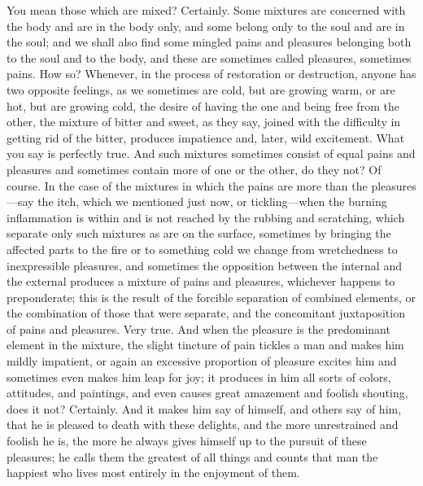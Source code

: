 \documentclass[letterpaper,12pt]{article}
\newcommand{\stephpag}[1]{\marginnote{\small\itshape\fontfamily{ppl}\selectfont #1}}
\begin{document}
\begin{drama}
\socratesspeaks
You mean those which are mixed?
\protarchusspeaks
Certainly.
\socratesspeaks
Some mixtures are concerned with the body and are in the body only, and some belong only to the soul and are in the soul; \stephpag{c} and we shall also find some mingled pains and pleasures belonging both to the soul and to the body, and these are sometimes called pleasures, sometimes pains.
\protarchusspeaks
How so?
\socratesspeaks
Whenever, in the process of restoration or destruction, anyone has two opposite feelings, as we sometimes are cold, but are growing warm, or are hot, but are growing cold, the desire of having the one and being free from the other, the mixture of bitter and sweet, as they say, joined with the difficulty in getting rid of the bitter, \stephpag{d} produces impatience and, later, wild excitement.
\protarchusspeaks
What you say is perfectly true.
\socratesspeaks
And such mixtures sometimes consist of equal pains and pleasures and sometimes contain more of one or the other, do they not?
\protarchusspeaks
Of course.
\socratesspeaks
In the case of the mixtures in which the pains are more than the pleasures---say the itch, which we mentioned just now, or tickling---when the burning inflammation is within and is not reached by the rubbing and scratching, \stephpag{e} which separate only such mixtures as are on the surface, sometimes by bringing the affected parts to the fire or to something cold we change from wretchedness to inexpressible pleasures, and sometimes the opposition between the internal and the external produces a mixture of pains and pleasures, whichever happens to preponderate; this is the result of the forcible separation of combined elements, \stephpag{47 a} or the combination of those that were separate, and the concomitant juxtaposition of pains and pleasures.
\protarchusspeaks
Very true.
\socratesspeaks
And when the pleasure is the predominant element in the mixture, the slight tincture of pain tickles a man and makes him mildly impatient, or again an excessive proportion of pleasure excites him and sometimes even makes him leap for joy; it produces in him all sorts of colors, attitudes, and paintings, and even causes great amazement and foolish shouting, does it not? \stephpag{b}
\protarchusspeaks
Certainly.
\socratesspeaks
And it makes him say of himself, and others say of him, that he is pleased to death with these delights, and the more unrestrained and foolish he is, the more he always gives himself up to the pursuit of these pleasures; he calls them the greatest of all things and counts that man the happiest who lives most entirely in the enjoyment of them.

\end{drama}
\end{document}
